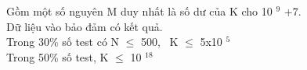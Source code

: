 Gồm một số nguyên M duy nhất là số dư của K cho 10 $^ 9 $ +7.
\\Dữ liệu vào bảo đảm có kết quả.
\\Trong 30\% số test có N  $\le$  500,  K  $\le$  5x10 $^ 5 $
\\Trong 50\% số test, K  $\le$  10 $^ 18 $

\
